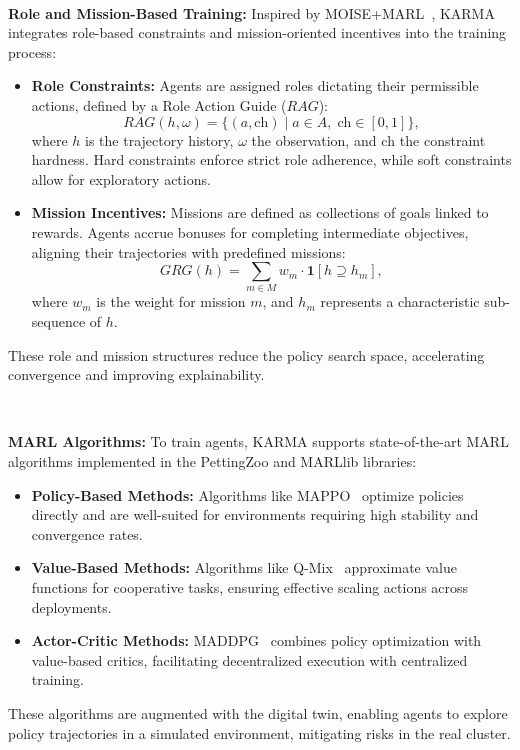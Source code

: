 \documentclass[conference]{IEEEtran}
\begin{document}
\

\noindent\textbf{Role and Mission-Based Training:} 
Inspired by MOISE+MARL~\cite{MOISEMARL2025}, KARMA integrates role-based constraints and mission-oriented incentives into the training process:
\begin{itemize}
    \item \textbf{Role Constraints:} Agents are assigned roles dictating their permissible actions, defined by a Role Action Guide ($RAG$):
    \[
    RAG(h, \omega) = \{(a, \text{ch}) \;|\; a \in A, \; \text{ch} \in [0,1]\},
    \]
    where $h$ is the trajectory history, $\omega$ the observation, and $\text{ch}$ the constraint hardness. Hard constraints enforce strict role adherence, while soft constraints allow for exploratory actions.
    \item \textbf{Mission Incentives:} Missions are defined as collections of goals linked to rewards. Agents accrue bonuses for completing intermediate objectives, aligning their trajectories with predefined missions:
    \[
    GRG(h) = \sum_{m \in M} w_m \cdot \mathbf{1}[h \supseteq h_m],
    \]
    where $w_m$ is the weight for mission $m$, and $h_m$ represents a characteristic sub-sequence of $h$.
\end{itemize}
These role and mission structures reduce the policy search space, accelerating convergence and improving explainability.

\

\noindent\textbf{MARL Algorithms:} 
To train agents, KARMA supports state-of-the-art MARL algorithms implemented in the PettingZoo and MARLlib libraries:
\begin{itemize}
    \item \textbf{Policy-Based Methods:} Algorithms like MAPPO~\cite{MAPPO2021} optimize policies directly and are well-suited for environments requiring high stability and convergence rates.
    \item \textbf{Value-Based Methods:} Algorithms like Q-Mix~\cite{QMIX2018} approximate value functions for cooperative tasks, ensuring effective scaling actions across deployments.
    \item \textbf{Actor-Critic Methods:} MADDPG~\cite{MADDPG2017} combines policy optimization with value-based critics, facilitating decentralized execution with centralized training.
\end{itemize}
These algorithms are augmented with the digital twin, enabling agents to explore policy trajectories in a simulated environment, mitigating risks in the real cluster.
\end{document}
